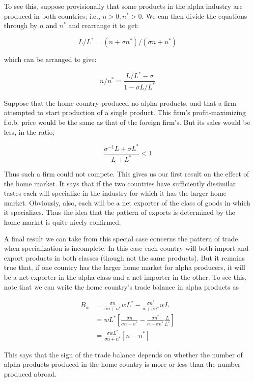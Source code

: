 To see this, suppose provisionally that some products in the alpha industry are produced in both countries; i.e., $n > 0, n^* > 0$. We can then divide the equations through by $n$ and $n^*$ and rearrange it to get:

\begin{equation}
    L / L^* = (n + \sigma n^*) / (\sigma n + n^*)
\end{equation}

which can be arranged to give:

\begin{equation}
    n / n^* = \frac{L / L^* - \sigma}{1 - \sigma L / L^*}
\end{equation}

Suppose that the home country produced no alpha products, and that a firm attempted to start production of a single product. This firm's profit-maximizing f.o.b. price would be the same as that of the foreign firm's. But its sales would be less, in the ratio,

\begin{equation*}
    \frac{\sigma^{-1}L + \sigma L^*}{L + L^*} < 1 
\end{equation*}

Thus such a firm could not compete. This gives us our first result on the effect of the home market. It says that if the two countries have sufficiently dissimilar tastes each will specialize in the industry for which it has the larger home market. Obviously, also, each will be a net exporter of the class of goods in which it specializes. Thus the idea that the pattern of exports is determined by the home market is quite nicely confirmed.

A final result we can take from this special case concerns the pattern of trade when specialization is incomplete. In this case each country will both import and export products in both classes (though not the same products). But it remains true that, if one country has the larger home market for alpha producers, it will be a net exporter in the alpha class and a net importer in the other. To see this, note that we can write the home country's trade balance in alpha products as

\begin{equation*}
    \begin{aligned}
        B_{\alpha} & = \frac{\sigma n}{\sigma n + n^*}wL^* - \frac{\sigma n^*}{n + \sigma n^*}wL \\
        & = wL^* [\frac{\sigma n}{\sigma n + n^*} - \frac{\sigma n^*}{n + \sigma n^*}\frac{L}{L^*}] \\
        & = \frac{\sigma wL^*}{\sigma n + n^*} [n - n^*]
    \end{aligned}
\end{equation*}

This says that the sign of the trade balance depends on whether the number of alpha products produced in the home country is more or less than the number produced abroad.

